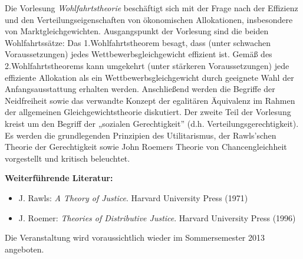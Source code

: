 \begin{course}
\begin{content}
Die Vorlesung \emph{Wohlfahrtstheorie }beschäftigt sich mit der Frage nach der Effizienz und den Verteilungseigenschaften von ökonomischen Allokationen, insbesondere von Marktgleichgewichten. Ausgangspunkt der Vorlesung sind die beiden Wohlfahrtssätze: Das 1.Wohlfahrtstheorem besagt, dass (unter schwachen Voraussetzungen) jedes Wettbewerbsgleichgewicht effizient ist. Gemäß des 2.Wohlfahrtstheorems kann umgekehrt (unter stärkeren Voraussetzungen) jede effiziente Allokation als ein Wettbewerbsgleichgewicht durch geeignete Wahl der Anfangsausstattung erhalten werden. Anschließend werden die Begriffe der Neidfreiheit sowie das verwandte Konzept der egalitären Äquivalenz im Rahmen der allgemeinen Gleichgewichtstheorie diskutiert. Der zweite Teil der Vorlesung kreist um den Begriff der „sozialen Gerechtigkeit” (d.h. Verteilungsgerechtigkeit). Es werden die grundlegenden Prinzipien des Utilitarismus, der Rawls'schen Theorie der Gerechtigkeit sowie John Roemers Theorie von Chancengleichheit vorgestellt und kritisch beleuchtet.


\end{content}



\begin{literature}\textbf{Weiterführende Literatur:}

 \begin{itemize}\item J. Rawls: \emph{A Theory of Justice}. Harvard University Press (1971)  \item J. Roemer: \emph{Theories of Distributive Justice}. Harvard University Press (1996)  \end{itemize}\end{literature}

\begin{remarks}Die Veranstaltung wird voraussichtlich wieder im Sommersemester 2013 angeboten.

\end{remarks}

\end{course}